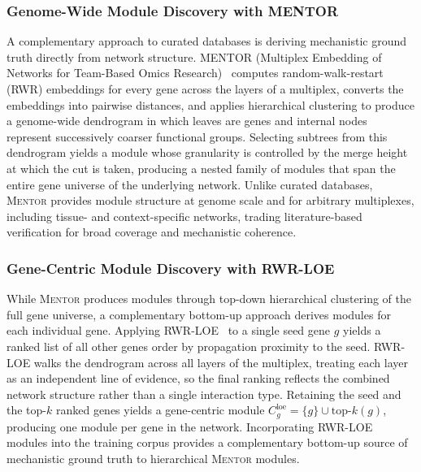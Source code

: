 \documentclass[thesis,letterpaper,12pt]{utthesis}
\begin{document}
\subsubsection{Genome-Wide Module Discovery with MENTOR}
A complementary approach to curated databases is deriving mechanistic ground truth directly from network structure. \textsc{MENTOR} (Multiplex Embedding of Networks for Team-Based Omics Research)~\cite{mentor} computes random-walk-restart (RWR) embeddings for every gene across the layers of a multiplex, converts the embeddings into pairwise distances, and applies hierarchical clustering to produce a genome-wide dendrogram in which leaves are genes and internal nodes represent successively coarser functional groups. Selecting subtrees from this dendrogram yields a module whose granularity is controlled by the merge height at which the cut is taken, producing a nested family of modules that span the entire gene universe of the underlying network. Unlike curated databases, \textsc{Mentor} provides module structure at genome scale and for arbitrary multiplexes, including tissue- and context-specific networks, trading literature-based verification for broad coverage and mechanistic coherence.

\subsubsection{Gene-Centric Module Discovery with RWR-LOE}
While \textsc{Mentor} produces modules through top-down hierarchical clustering of the full gene universe, a complementary bottom-up approach derives modules for each individual gene. Applying RWR-LOE~\cite{kainer2025rwrtoolkit} to a single seed gene $g$ yields a ranked list of all other genes order by propagation proximity to the seed. RWR-LOE walks the dendrogram across all layers of the multiplex, treating each layer as an independent line of evidence, so the final ranking reflects the combined network structure rather than a single interaction type. Retaining the seed and the top-$k$ ranked genes yields a gene-centric module $C^{\text{loe}}_g = \{g\} \cup \mathrm{top\text{-}}k(g)$, producing one module per gene in the network. Incorporating RWR-LOE modules into the training corpus provides a complementary bottom-up source of mechanistic ground truth to hierarchical \textsc{Mentor} modules.
\end{document}
